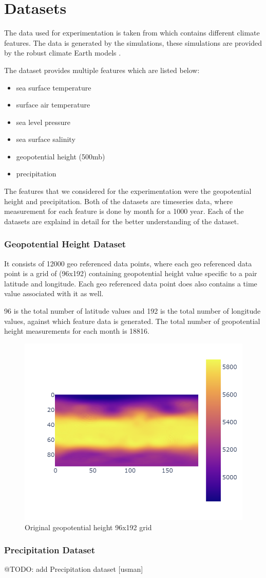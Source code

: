 
\clearpage
\cleardoublepage

\chapter{Datasets}
\label{chap:dataset}

The data used for experimentation is taken from \cite{willi_rath_2023_7779883} which contains different climate features. The data is generated by the simulations, these simulations are provided by the robust climate Earth models \cite{willi_rath_2023_7779883}.

The dataset provides multiple features which are listed below:
\begin{itemize}
    \item sea surface temperature
    \item surface air temperature
    \item sea level pressure
    \item sea surface salinity
    \item geopotential height (500mb)
    \item precipitation
\end{itemize}

The features that we considered for the experimentation were the geopotential height and precipitation.
Both of the datasets are timeseries data, where measurement for each feature is done by month for a 1000 year. Each of the datasets are explaind in detail for the better understanding of the dataset.
\newpage
\subsection{Geopotential Height Dataset}
It consists of 12000 geo referenced data points, where each geo referenced data point is a grid of (96x192) containing geopotential height value specific to a pair latitude and longitude.
Each geo referenced data point does also contains a time value associated with it as well.

96  is the total number of latitude values and  192 is the total number of longitude values, against which feature data is generated. The total number of geopotential height measurements for each month is 18816.

\begin{figure}[h]
    \centering
    \includegraphics[width=0.6\linewidth]{figures/chapter-5/data_original.png}
    \caption{Original geopotential height 96x192 grid }
    \label{fig:org_geopoth}
\end{figure}

\subsection{Precipitation Dataset}

@TODO: add Precipitation dataset [usman]